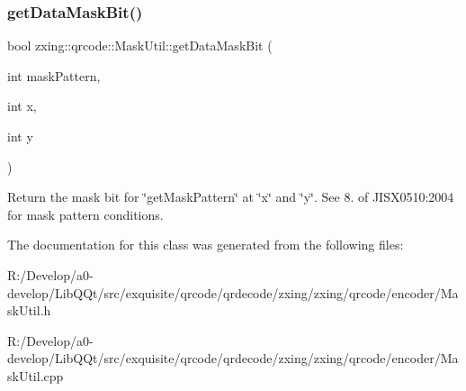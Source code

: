 \subsubsection{\texorpdfstring{get\+Data\+Mask\+Bit()}{getDataMaskBit()}}
{\footnotesize\ttfamily bool zxing\+::qrcode\+::\+Mask\+Util\+::get\+Data\+Mask\+Bit (\begin{DoxyParamCaption}\item[{int}]{mask\+Pattern,  }\item[{int}]{x,  }\item[{int}]{y }\end{DoxyParamCaption})\hspace{0.3cm}{\ttfamily [static]}}

Return the mask bit for \char`\"{}get\+Mask\+Pattern\char`\"{} at \char`\"{}x\char`\"{} and \char`\"{}y\char`\"{}. See 8. of J\+I\+S\+X0510\+:2004 for mask pattern conditions. 

The documentation for this class was generated from the following files\+:\begin{DoxyCompactItemize}
\item 
R\+:/\+Develop/a0-\/develop/\+Lib\+Q\+Qt/src/exquisite/qrcode/qrdecode/zxing/zxing/qrcode/encoder/Mask\+Util.\+h\item 
R\+:/\+Develop/a0-\/develop/\+Lib\+Q\+Qt/src/exquisite/qrcode/qrdecode/zxing/zxing/qrcode/encoder/Mask\+Util.\+cpp\end{DoxyCompactItemize}
